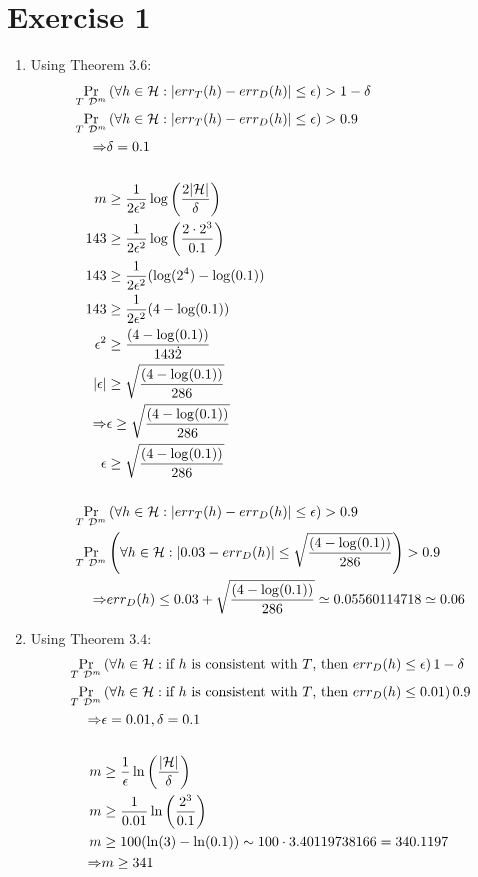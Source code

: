 \documentclass[12pt]{article}
\DeclarePairedDelimiter\abs{\lvert}{\rvert}
\begin{document}
\section*{Exercise 1}
\begin{enumerate}[label=(\alph*)]
	\item	Using Theorem 3.6:
			\begin{align*}
				\Pr_{T ~ \mathcal{D}^m} &\left( \forall h \in \mathcal{H}: \abs{err_T(h) - err_D(h)} \leq \epsilon \right) > 1 - \delta \\
				\Pr_{T ~ \mathcal{D}^m} &\left( \forall h \in \mathcal{H}: \abs{err_T(h) - err_D(h)} \leq \epsilon \right) > 0.9 \\
				\Rightarrow &\delta = 0.1 \\\\
				m &\geq \frac{1}{2\epsilon^2} \log \left( \frac{2\abs{\mathcal{H}}}{\delta} \right) \\
				143 &\geq \frac{1}{2\epsilon^2} \log \left( \frac{2 \cdot 2^3}{0.1} \right) \\
				143 &\geq \frac{1}{2\epsilon^2} (\log(2^4) - \log(0.1)) \\
				143 &\geq \frac{1}{2\epsilon^2} (4 - \log(0.1)) \\
				\epsilon^2 &\geq \frac{(4 - \log(0.1))}{143 \dot 2} \\
				\abs{\epsilon} &\geq \sqrt{\frac{(4 - \log(0.1))}{286}} \\
				\Rightarrow &\epsilon \geq \sqrt{\frac{(4 - \log(0.1))}{286}} \\
				\epsilon &\geq \sqrt{\frac{(4 - \log(0.1))}{286}} \\\\
				\Pr_{T ~ \mathcal{D}^m} &\left( \forall h \in \mathcal{H}: \abs{err_T(h) - err_D(h)} \leq \epsilon \right) > 0.9 \\
				\Pr_{T ~ \mathcal{D}^m} &\left( \forall h \in \mathcal{H}: \abs{0.03 - err_D(h)} \leq \sqrt{\frac{(4 - \log(0.1))}{286}} \right) > 0.9 \\
				\Rightarrow &err_D(h) \leq 0.03 + \sqrt{\frac{(4 - \log(0.1))}{286}} \simeq 0.05560114718 \simeq 0.06
			\end{align*}
	\item	Using Theorem 3.4:
			\begin{align*}
				\Pr_{T ~ \mathcal{D}^m} &\left( \forall h \in \mathcal{H}: \text{if $h$ is consistent with $T$, then } err_D(h) \leq \epsilon \right) 1 - \delta \\
				\Pr_{T ~ \mathcal{D}^m} &\left( \forall h \in \mathcal{H}: \text{if $h$ is consistent with $T$, then } err_D(h) \leq 0.01 \right) 0.9 \\
				\Rightarrow &\epsilon = 0.01, \delta = 0.1 \\\\
				m &\geq \frac{1}{\epsilon} \ln \left( \frac{\abs{\mathcal{H}}}{\delta} \right) \\
				m &\geq \frac{1}{0.01} \ln \left( \frac{2^3}{0.1} \right) \\
				m &\geq 100 (\ln(3) - \ln(0.1)) \sim 100 \cdot 3.40119738166 = 340.1197 \\
				\Rightarrow &m \geq 341
			\end{align*}
\end{enumerate}
\end{document}
